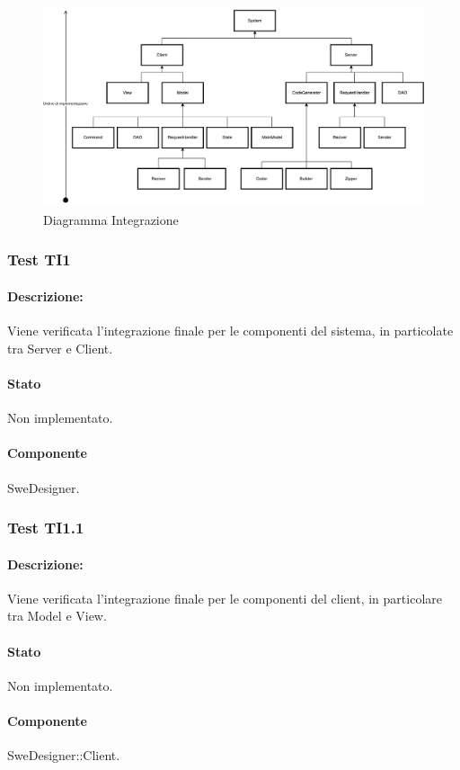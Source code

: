 \documentclass[../PianoDiQualifica.tex]{subfiles}
\begin{document}
	\begin{figure}[htbp]
		\centering
\includegraphics[scale=0.45]{Figures/Integrazione.pdf}
\caption{Diagramma Integrazione}\label{}
	\end{figure}
	
		
	\subsubsection{Test TI1}
	\paragraph{Descrizione:} Viene verificata l'integrazione finale per le componenti del sistema, in particolate tra Server e Client.
	\paragraph{Stato} Non implementato.
	\paragraph{Componente} SweDesigner.
	\subsubsection{Test TI1.1}
	\paragraph{Descrizione:} Viene verificata l'integrazione finale per le componenti del client, in particolare tra  Model e View.
	\paragraph{Stato} Non implementato.
	\paragraph{Componente} SweDesigner::Client.
\end{document}
